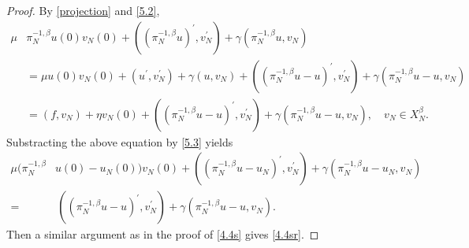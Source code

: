 \documentclass[10pt,reqno]{amsart}
\theoremstyle{remark}
\theoremstyle{definition}
\begin{document}
\begin{proof} By \eqref{projection} and \eqref{5.2},
\begin{align*}
\mu &\pi_N^{-1,\beta}u(0) v_N(0) +    ((\pi_N^{-1,\beta}u)^{\prime}, v_N^{\prime}) + \gamma(  \pi_N^{-1,\beta}u , v_N)
\\
&= \mu u(0) v_N(0)  +  (u^{\prime}, v_N^{\prime}) +  \gamma ( u, v_N) + ( (\pi_N^{-1,\beta} u-u)^\prime,v_{N}^\prime)+\gamma (\pi_N^{-1,\beta}  u-u,v_{N})
\\
&= (f,v_N) + \eta v_N(0) +( (\pi_N^{-1,\beta} u-u)^\prime,v_{N}^\prime)+\gamma (\pi_N^{-1,\beta}  u-u,v_{N}), \quad v_N\in X_N^{\beta}.
\end{align*}
Substracting the above equation by \eqref{5.3} yields
\begin{align*}
\mu (\pi_N^{-1,\beta}&u(0)-u_N(0)) v_N(0) +    ((\pi_N^{-1,\beta}u-u_N)^{\prime}, v_N^{\prime}) + \gamma(  \pi_N^{-1,\beta}u-u_N , v_N)
\\
 =&\,
  ( (\pi_N^{-1,\beta} u-u)^\prime,v_{N}^\prime)+\gamma (\pi_N^{-1,\beta}  u-u,v_{N}).
\end{align*}
Then a similar argument as in the proof  of  \eqref{4.4s}  gives \eqref{4.4sr}.


\end{proof}
\end{document}
